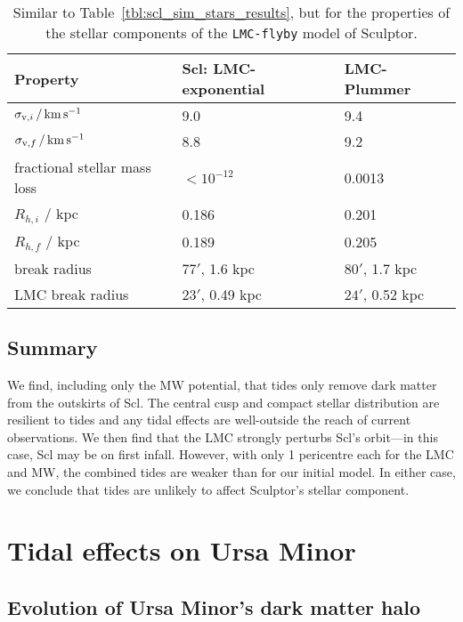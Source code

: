 \begin{table*}[t]
\centering
\caption[Simulation results for Sculptor’s stars in the LMC+MW potential]{Similar to Table \ref{tbl:scl_sim_stars_results}, but for the properties of the stellar components of the \texttt{LMC-flyby} model of Sculptor. }
\label{tbl:scl_lmc_sim_stars}
\begin{tabular}{lll}
\toprule
Property & Scl: LMC-exponential & LMC-Plummer\\
\midrule
$\sigma_{{\rm v}, i}\,/\,{\rm km\,s^{-1}}$ & 9.0 & 9.4\\
$\sigma_{{\rm v}, f} \,/\,{\rm km\,s^{-1}}$ & 8.8 & 9.2\\
fractional stellar mass loss & $<10^{-12}$ & 0.0013\\
$R_{h, i}$ / kpc & 0.186 & 0.201\\
$R_{h, f}$ / kpc & 0.189 & 0.205\\
break radius & $77'$, 1.6 kpc & $80'$, 1.7 kpc\\
LMC break radius & $23'$, 0.49 kpc & $24'$, 0.52 kpc\\
\bottomrule
\end{tabular}
\end{table*}

\subsection{Summary}\label{summary}

We find, including only the MW potential, that tides only remove dark
matter from the outskirts of Scl. The central cusp and compact stellar
distribution are resilient to tides and any tidal effects are
well-outside the reach of current observations. We then find that the
LMC strongly perturbs Scl's orbit---in this case, Scl may be on first
infall. However, with only 1 pericentre each for the LMC and MW, the
combined tides are weaker than for our initial model. In either case, we
conclude that tides are unlikely to affect Sculptor's stellar component.

\section{Tidal effects on Ursa Minor}\label{tidal-effects-on-ursa-minor}

\subsection{Evolution of Ursa Minor's dark matter
halo}\label{evolution-of-ursa-minors-dark-matter-halo}

